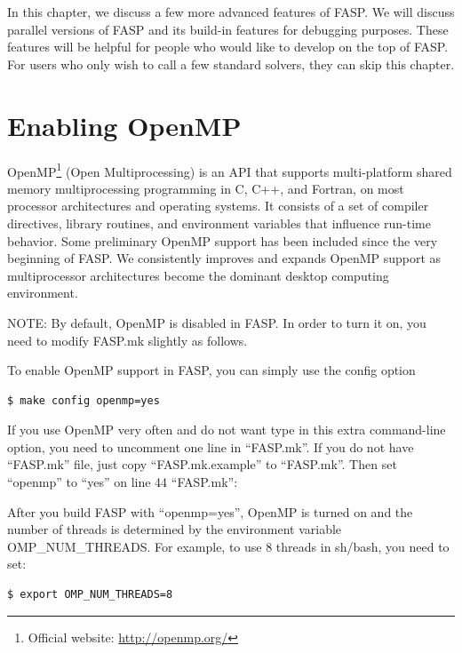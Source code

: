 \documentclass[11pt]{memoir}
\begin{document}
In this chapter, we discuss a few more advanced features of FASP. We
will discuss parallel versions of FASP and its build-in features for
debugging purposes. These features will be helpful for people who
would like to develop on the top of FASP. For users who only wish to
call a few standard solvers, they can skip this chapter.

\section{Enabling OpenMP}\label{sec:mop}

OpenMP\footnote{Official website: \url{http://openmp.org/}} (Open Multiprocessing) is an API that supports multi-platform shared memory multiprocessing programming in C, C++, and Fortran, on most processor architectures and operating systems. It consists of a set of compiler directives, library routines, and environment variables that influence run-time behavior. Some preliminary OpenMP support has been included since the very beginning of FASP. We consistently improves and expands OpenMP support as multiprocessor architectures become the dominant desktop computing environment.

\begin{snugshade}\noindent
NOTE: By default, OpenMP is disabled in FASP. In order to turn it on, you need to modify FASP.mk slightly as follows.
\end{snugshade}

To enable OpenMP support in FASP, you can simply use the config option
%
\begin{lstlisting}[numbers=none]
$ make config openmp=yes
\end{lstlisting}
%
If you use OpenMP very often and do not want type in this extra
command-line option, you need to uncomment one line in ``FASP.mk''.
If you do not have ``FASP.mk'' file, just copy ``FASP.mk.example'' to
``FASP.mk''. Then set ``openmp'' to ``yes'' on line 44 ``FASP.mk'':


After you build FASP with ``openmp=yes'', OpenMP is turned on and the number of threads is determined by the environment variable OMP\_NUM\_THREADS. For example, to use 8 threads in {\color{red} sh/bash}, you need to set:
\begin{lstlisting}[numbers=none]
$ export OMP_NUM_THREADS=8
\end{lstlisting}
\end{document}
